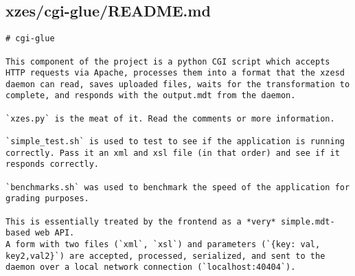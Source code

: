 \subsection{xzes/cgi-glue/README.md}
\begin{lstlisting}[caption={Overview of the Python Apache CGI component.}]
# cgi-glue

This component of the project is a python CGI script which accepts HTTP requests via Apache, processes them into a format that the xzesd daemon can read, saves uploaded files, waits for the transformation to complete, and responds with the output.mdt from the daemon.

`xzes.py` is the meat of it. Read the comments or more information.

`simple_test.sh` is used to test to see if the application is running correctly. Pass it an xml and xsl file (in that order) and see if it responds correctly.

`benchmarks.sh` was used to benchmark the speed of the application for grading purposes.

This is essentially treated by the frontend as a *very* simple.mdt-based web API.
A form with two files (`xml`, `xsl`) and parameters (`{key: val, key2,val2}`) are accepted, processed, serialized, and sent to the daemon over a local network connection (`localhost:40404`).
\end{lstlisting}
